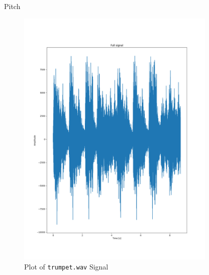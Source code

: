 \begin{hwkProblem}{6.2}{Pitch}
	\solution

	\solpart

	\begin{figure}[ht!]
	  \centering
	  \includegraphics[width=0.85\textwidth]{./6.2.1.png}
	  \caption{Plot of \lstinline{trumpet.wav} Signal}
	\end{figure}

	\newpage
	\solpart


\end{hwkProblem}
